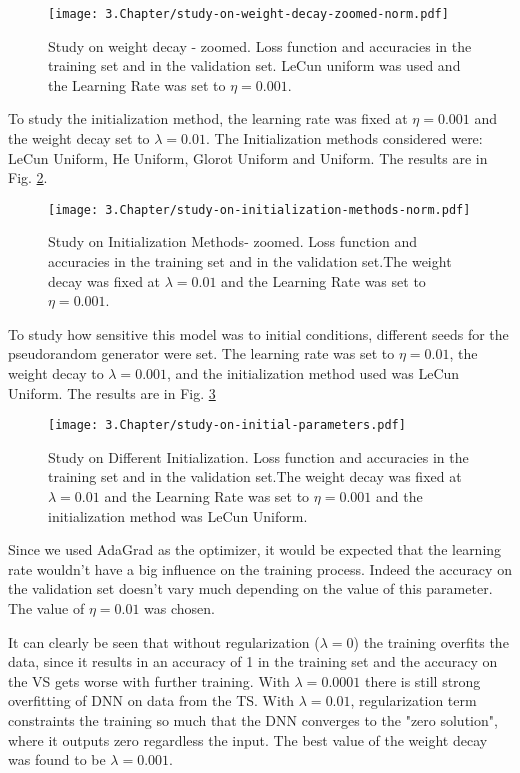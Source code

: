 \begin{figure}[htbp]
	\centering
	\texttt{[image: 3.Chapter/study-on-weight-decay-zoomed-norm.pdf]}
	\caption{Study on weight decay - zoomed. Loss function and accuracies in the training set and in the validation set. LeCun uniform was used and the Learning Rate was set to $\eta = 0.001$.
}
\label{fig:study-weightdecays-zoomed}
\end{figure}


To study the initialization method, the learning rate was fixed at $\eta = 0.001$ and the weight decay set to $\lambda = 0.01$. The Initialization methods considered were: LeCun Uniform, He Uniform, Glorot Uniform and Uniform. The results are in Fig. \ref{fig:study-InitMethods}.
\begin{figure}[htbp]
	\centering
	\texttt{[image: 3.Chapter/study-on-initialization-methods-norm.pdf]}
	\caption{Study on Initialization Methods- zoomed. Loss function and accuracies in the training set and in the validation set.The weight decay was fixed at $\lambda = 0.01$ and the Learning Rate was set to $\eta = 0.001$.
}
\label{fig:study-InitMethods}
\end{figure}

To study how sensitive this model was to initial conditions, different seeds for the pseudorandom generator were set. The learning rate was set to $\eta = 0.01$, the weight decay to $\lambda = 0.001$, and the initialization method used was LeCun Uniform. The results are in Fig. \ref{fig:study-seeds}

\begin{figure}[htbp]
	\centering
	\texttt{[image: 3.Chapter/study-on-initial-parameters.pdf]}
	\caption{Study on Different Initialization. Loss function and accuracies in the training set and in the validation set.The weight decay was fixed at $\lambda = 0.01$ and the Learning Rate was set to $\eta = 0.001$ and the initialization method was LeCun Uniform.
}
\label{fig:study-seeds}
\end{figure}

Since we used AdaGrad as the optimizer, it would be expected that the learning rate wouldn't have a big influence on the training process. Indeed the accuracy on the validation set doesn't vary much depending on the value of this parameter. The value of $\eta = 0.01$ was chosen.

It can clearly be seen that without regularization ($\lambda = 0$) the training overfits the data, since it results in an accuracy of 1 in the training set and the accuracy on the VS gets worse with further training. With $\lambda = 0.0001$ there is still strong overfitting of DNN on data from the TS. With $\lambda = 0.01$, regularization term constraints the training so much that the DNN converges to the "zero solution", where it outputs zero regardless the input. The best value of the weight decay was found to be $\lambda = 0.001$.


